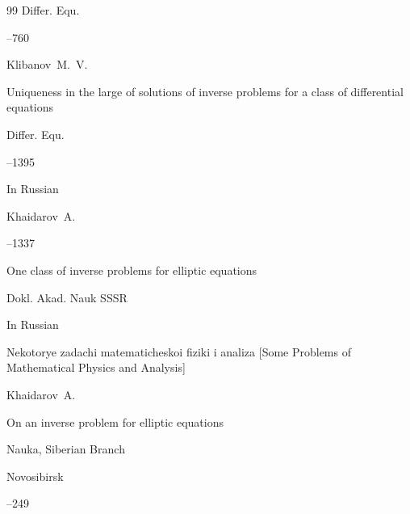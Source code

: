 \begin{thebibliography}{99}
\jour Differ. Equ.



--760 








\by Klibanov~M.~V.

\paper Uniqueness in the large of solutions of inverse problems for a class of differential equations

\jour Differ. Equ.



--1395 







\lang In Russian

\by Khaidarov~A. 




--1337

\paper One class of inverse problems for elliptic equations 

\jour Dokl. Akad. Nauk SSSR










\lang In Russian

\inbook Nekotorye zadachi matema\-tiches\-koi fiziki i analiza \rm [Some Problems of Mathematical Physics and Analysis]

\by Khaidarov~A. 

\paper On an inverse problem for elliptic equations

\publ Nauka, Siberian Branch

\publaddr Novosibirsk 


–249







\end{thebibliography}
